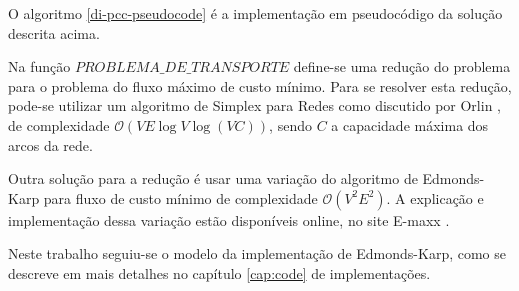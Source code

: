     O algoritmo \ref{di-pcc-pseudocode} é a implementação em pseudocódigo da solução descrita acima.

    Na função $PROBLEMA\_DE\_TRANSPORTE$ define-se uma redução do problema para o problema do fluxo máximo de custo mínimo. 
    Para se resolver esta redução, pode-se utilizar um algoritmo de Simplex para Redes como discutido por Orlin \cite{network-simplex}, de complexidade $\mathcal{O}(VE\log V\log(VC))$, sendo $C$ a capacidade máxima dos arcos da rede. 

    Outra solução para a redução é usar uma variação do algoritmo de Edmonds-Karp \cite{edmonds-karp} para fluxo de custo mínimo de complexidade $\mathcal{O}(V^2E^2)$. 
    A explicação e implementação dessa variação estão disponíveis online, no site E-maxx \cite{min-cost}. 

    Neste trabalho seguiu-se o modelo da implementação de Edmonds-Karp, como se descreve em mais detalhes no capítulo \ref{cap:code} de implementações.


